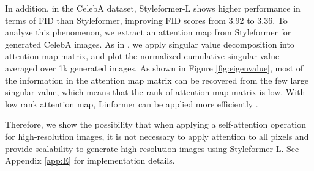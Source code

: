 \documentclass[10pt,twocolumn,letterpaper]{article}
\begin{document}
In addition, in the CelebA dataset, Styleformer-L shows higher performance in terms of FID than Styleformer, improving FID scores from 3.92 to 3.36. To analyze this phenomenon, we extract an attention map from Styleformer for generated CelebA images. As in \cite{wang2020linformer}, we apply singular value decomposition into attention map matrix, and plot the normalized cumulative singular value averaged over 1k generated images. As shown in Figure \ref{fig:eigenvalue}, most of the information in the attention map matrix can be recovered from the few large singular value, which means that the rank of attention map matrix is low. With low rank attention map, Linformer can be applied more efficiently \cite{wang2020linformer}.

Therefore, we show the possibility that when applying a self-attention operation for high-resolution images, it is not necessary to apply attention to all pixels and provide scalability to generate high-resolution images using Styleformer-L. See Appendix \ref{app:E} for implementation details.






\begin{table}[!t]
\centering
{}
\caption{Comparison between popular CNN based GAN models and Styleformer-C on CLEVR and Cityscapes. We use the results in \cite{hudson2021generative} for the performance of other models.}
\label{table:styleformer-C}
\end{table}
\end{document}
